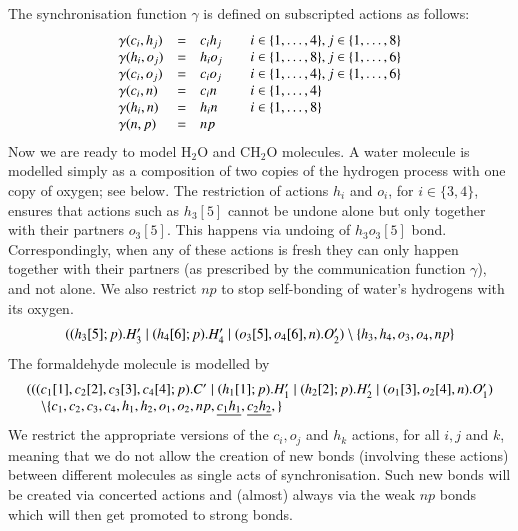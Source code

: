 The synchronisation function $\gamma$ is defined on subscripted actions as follows:
%
$$\begin{array}{ l c l l }
\gamma(c_i,h_j) & = & c_ih_j \quad & i \in \{1,\ldots, 4\}, j\in\{1,\ldots,8\} \\
\gamma(h_i,o_j) & = & h_io_j \quad & i \in \{1,\ldots, 8\}, j\in\{1,\ldots,6\}  \\
\gamma(c_i,o_j) & = & c_io_j \quad & i \in \{1,\ldots, 4\}, j\in\{1,\ldots,6\} \\
\gamma(c_i,n) & = & c_in & i \in \{1,\ldots, 4\} \\
\gamma(h_i,n) & = & h_in & i \in \{1,\ldots,8\}  \\
\gamma(n,p) & = & np &  \\
\end{array}$$
Now we are ready to model $\mathrm{H_2O}$ and $\mathrm{CH_2O}$ molecules. A water molecule is modelled 
simply as a composition of two copies of the hydrogen process with one copy of oxygen; see below. 
%
The restriction of actions $h_i$ and $o_i$, for $i\in\{3,4\}$, ensures that actions such as 
$h_3[5]$ cannot be undone alone but only together with their partners $o_3[5]$. This happens via
undoing of $h_3o_3[5]$ bond. Correspondingly, when
any of these actions is fresh they can only happen together with their partners (as prescribed by
the communication function $\gamma$), and not alone. 
We also restrict $np$ to stop self-bonding of water's hydrogens with its oxygen.
%
$$\begin{array}{l}
((h_3[5];p).H'_3 \; \vert \; (h_4[6];p).H'_4 \; \vert \; (o_3[5],o_4[6],n).O'_2)
  \setminus\{h_3,h_4,o_3,o_4, np\} \\
\end{array}$$
The formaldehyde molecule is modelled by
$$\begin{array}{l}
(((c_1[1],c_2[2],c_3[3],c_4[4];p).C' \; \vert \; (h_1[1];p).H'_1 \; \vert \; (h_2[2];p).H'_2 \; \vert \;
(o_1[3],o_2[4],n).O'_1)\\
  \quad \setminus\{c_1,c_2,c_3,c_4,h_1,h_2,o_1,o_2,np,\underline{c_{1}h_{1}}, \underline{c_{2}h_{2}},
  \}
\end{array}$$
We restrict the appropriate versions of the $c_i, o_j$ and $h_k$ actions, for
all $i,j$ and $k$, meaning that we do not allow the creation of new bonds (involving these actions)
between different molecules as single acts of synchronisation. Such new bonds will be created
via concerted actions and (almost) always via the weak $np$ bonds which will then get promoted
to strong bonds.

